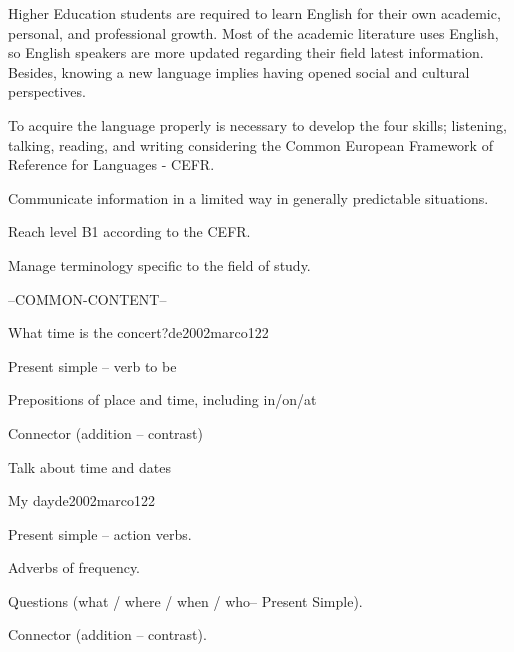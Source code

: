 \begin{syllabus}


\begin{justification}
Higher Education students are required to learn English for their own academic, 
personal, and professional growth. Most of the academic literature uses English, 
so English speakers are more updated regarding their field latest information. 
Besides, knowing a new language implies having opened social and 
cultural perspectives.  

To acquire the language properly is necessary to develop the four skills;
listening, talking, reading, and writing considering the 
Common European Framework of Reference for Languages - CEFR.
\end{justification}

\begin{goals}
\item Communicate information in a limited way in generally predictable situations.
\item Reach level B1 according to the CEFR.
\item Manage terminology specific to the field of study.
\end{goals}

--COMMON-CONTENT--

\begin{unit}{What time is the concert?}{}{de2002marco}{12}{2}
   \begin{topics}
      \item Present simple – verb to be
      \item Prepositions of place and time, including in/on/at
      \item Connector (addition – contrast)
   \end{topics}

   \begin{learningoutcomes}
      \item Talk about time and dates
   \end{learningoutcomes}

\end{unit}
\begin{unit}{My day}{}{de2002marco}{12}{2}
   \begin{topics}
      \item Present simple – action verbs.
      \item Adverbs of frequency.
      \item Questions (what / where / when / who– Present Simple).
      \item Connector (addition – contrast).
   \end{topics}


\end{unit}
\end{syllabus}
